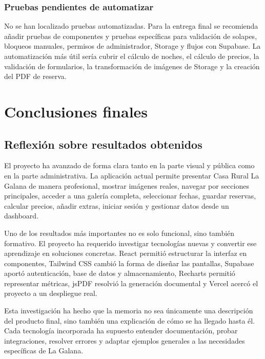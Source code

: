\documentclass[11pt,a4paper]{article}
\begin{document}
\subsubsection{Pruebas pendientes de automatizar}
No se han localizado pruebas automatizadas. Para la entrega final se recomienda añadir pruebas de componentes y pruebas específicas para validación de solapes, bloqueos manuales, permisos de administrador, Storage y flujos con Supabase. La automatización más útil sería cubrir el cálculo de noches, el cálculo de precios, la validación de formularios, la transformación de imágenes de Storage y la creación del PDF de reserva.

\section{Conclusiones finales}

\subsection{Reflexión sobre resultados obtenidos}
El proyecto ha avanzado de forma clara tanto en la parte visual y pública como en la parte administrativa. La aplicación actual permite presentar Casa Rural La Galana de manera profesional, mostrar imágenes reales, navegar por secciones principales, acceder a una galería completa, seleccionar fechas, guardar reservas, calcular precios, añadir extras, iniciar sesión y gestionar datos desde un dashboard.

Uno de los resultados más importantes no es solo funcional, sino también formativo. El proyecto ha requerido investigar tecnologías nuevas y convertir ese aprendizaje en soluciones concretas. React permitió estructurar la interfaz en componentes, Tailwind CSS cambió la forma de diseñar las pantallas, Supabase aportó autenticación, base de datos y almacenamiento, Recharts permitió representar métricas, jsPDF resolvió la generación documental y Vercel acercó el proyecto a un despliegue real.

Esta investigación ha hecho que la memoria no sea únicamente una descripción del producto final, sino también una explicación de cómo se ha llegado hasta él. Cada tecnología incorporada ha supuesto entender documentación, probar integraciones, resolver errores y adaptar ejemplos generales a las necesidades específicas de La Galana.
\end{document}
